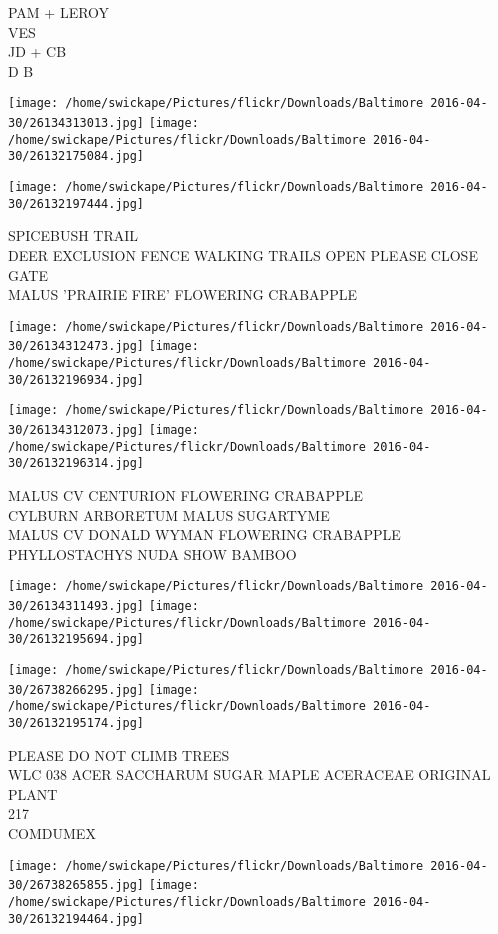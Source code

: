 \documentclass[10pt,letterpaper]{article}
\begin{document}
PAM + LEROY\\
VES\\
JD + CB\\
D B
\pagebreak

\texttt{[image: /home/swickape/Pictures/flickr/Downloads/Baltimore 2016-04-30/26134313013.jpg]}
\texttt{[image: /home/swickape/Pictures/flickr/Downloads/Baltimore 2016-04-30/26132175084.jpg]}

\vspace{0.25in}
\texttt{[image: /home/swickape/Pictures/flickr/Downloads/Baltimore 2016-04-30/26132197444.jpg]}

SPICEBUSH TRAIL\\
DEER EXCLUSION FENCE WALKING TRAILS OPEN PLEASE CLOSE GATE\\
MALUS 'PRAIRIE FIRE' FLOWERING CRABAPPLE
\pagebreak

\texttt{[image: /home/swickape/Pictures/flickr/Downloads/Baltimore 2016-04-30/26134312473.jpg]}
\texttt{[image: /home/swickape/Pictures/flickr/Downloads/Baltimore 2016-04-30/26132196934.jpg]}

\texttt{[image: /home/swickape/Pictures/flickr/Downloads/Baltimore 2016-04-30/26134312073.jpg]}
\texttt{[image: /home/swickape/Pictures/flickr/Downloads/Baltimore 2016-04-30/26132196314.jpg]}

MALUS CV CENTURION FLOWERING CRABAPPLE\\
CYLBURN ARBORETUM MALUS SUGARTYME\\
MALUS CV DONALD WYMAN FLOWERING CRABAPPLE\\
PHYLLOSTACHYS NUDA SHOW BAMBOO
\pagebreak

\texttt{[image: /home/swickape/Pictures/flickr/Downloads/Baltimore 2016-04-30/26134311493.jpg]}
\texttt{[image: /home/swickape/Pictures/flickr/Downloads/Baltimore 2016-04-30/26132195694.jpg]}

\texttt{[image: /home/swickape/Pictures/flickr/Downloads/Baltimore 2016-04-30/26738266295.jpg]}
\texttt{[image: /home/swickape/Pictures/flickr/Downloads/Baltimore 2016-04-30/26132195174.jpg]}

PLEASE DO NOT CLIMB TREES\\
WLC 038 ACER SACCHARUM SUGAR MAPLE ACERACEAE ORIGINAL PLANT\\
217\\
COMDUMEX
\pagebreak

\texttt{[image: /home/swickape/Pictures/flickr/Downloads/Baltimore 2016-04-30/26738265855.jpg]}
\texttt{[image: /home/swickape/Pictures/flickr/Downloads/Baltimore 2016-04-30/26132194464.jpg]}
\end{document}
